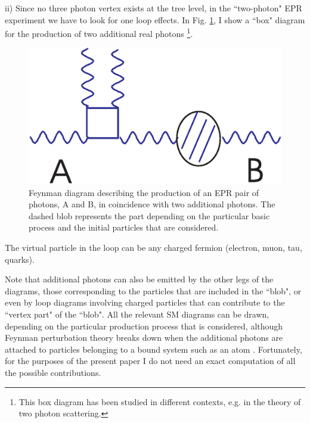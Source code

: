 \documentclass[aps,prl,showkeys,showpacs,preprint,groupedaddress,12pt]{revtex4}
\begin{document}
ii) Since no three photon vertex exists at the tree level, in the
``two-photon" EPR experiment we have to look for one loop effects.
In Fig. \ref{fig3}, I show a ``box" diagram for the production of
two additional real photons \footnote{This box diagram has been
studied in different contexts, e.g. in the theory of two photon
scattering.}.
\begin{figure}
\includegraphics{fig3.eps}
\caption{\label{fig3} Feynman diagram describing the production of
an EPR pair of photons, A and B, in coincidence with two
additional photons. The dashed blob represents the part depending
on the particular basic process and the initial particles that are
considered.}
\end{figure}
The virtual particle in the loop can be any charged fermion
(electron, muon, tau, quarks).

Note that additional photons can also be emitted by the other legs
of the diagrams, those corresponding to the particles that are
included in the ``blob", or even by loop diagrams involving
charged particles that can contribute to the ``vertex part" of the
``blob". All the relevant SM diagrams can be drawn, depending on
the particular production process that is considered, although
Feynman perturbation theory breaks down when the additional
photons are attached to particles belonging to a bound system such
as an atom \cite{WeinbookI}. Fortunately, for the purposes of the
present paper I do not need an exact computation of all the
possible contributions.
\end{document}
